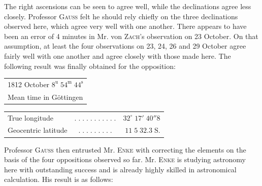 \par\indent The right ascensions can be seen to agree well, while the declinations agree less closely. Professor \textsc{Gauss} felt he should rely chiefly on the three declinations observed here, which agree very well with one another. There appears to have been an error of 4 minutes in Mr. von \textsc{Zach}’s observation on 23 October. On that assumption, at least the four observations on 23, 24, 26 and 29 October agree fairly well with one another and agree closely with those made here. The following result was finally obtained for the opposition:

\medskip
\begin{center}\fontsize{10}{12}\selectfont\setlength{\tabcolsep}{2pt}\renewcommand{\arraystretch}{1.15}\begin{tabular}{l}
1812 October $8^{\mathrm u}\;54^{\mathrm m}\;44^{\mathrm s}$\\Mean time in Göttingen
\end{tabular}\end{center}
\begin{center}\fontsize{10}{12}\selectfont\setlength{\tabcolsep}{2pt}\renewcommand{\arraystretch}{1.15}\begin{tabular}{lcr}
True longitude & $.\;.\;.\;.\;.\;.\;.\;.\;.\;.\;.$ & $32^\circ\;17'\;40''8$\\
Geocentric latitude & $.\;.\;.\;.\;.\;.\;.\;.\;.$ & $11\;5\;32.3\;\text{S.}$\\
\end{tabular}\end{center}

\par\indent Professor \textsc{Gauss} then entrusted Mr. \textsc{Enke} with correcting the elements on the basis of the four oppositions observed so far. Mr. \textsc{Enke} is studying astronomy here with outstanding success and is already highly skilled in astronomical calculation. His result is as follows:

